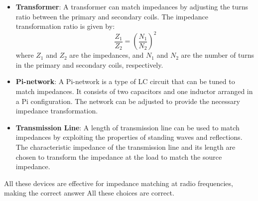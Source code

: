 \begin{itemize}
    \item \textbf{Transformer}: A transformer can match impedances by adjusting the turns ratio between the primary and secondary coils. The impedance transformation ratio is given by:
    \[
    \frac{Z_1}{Z_2} = \left(\frac{N_1}{N_2}\right)^2
    \]
    where \( Z_1 \) and \( Z_2 \) are the impedances, and \( N_1 \) and \( N_2 \) are the number of turns in the primary and secondary coils, respectively.

    \item \textbf{Pi-network}: A Pi-network is a type of LC circuit that can be tuned to match impedances. It consists of two capacitors and one inductor arranged in a Pi configuration. The network can be adjusted to provide the necessary impedance transformation.

    \item \textbf{Transmission Line}: A length of transmission line can be used to match impedances by exploiting the properties of standing waves and reflections. The characteristic impedance of the transmission line and its length are chosen to transform the impedance at the load to match the source impedance.
\end{itemize}

All these devices are effective for impedance matching at radio frequencies, making the correct answer All these choices are correct.

